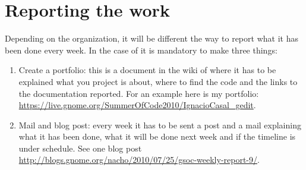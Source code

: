 \section{Reporting the work}\label{ReportingGSoC}

Depending on the organization, it will be different the way to report what it has been done every week. In the case of \GNOME it is mandatory to make three things:

\begin{enumerate}
  \item Create a portfolio: this is a document in the wiki of \GNOME where it has to be explained what you project is about, where to find the code and the links to the documentation reported. For an example here is my portfolio: \url{https://live.gnome.org/SummerOfCode2010/IgnacioCasal_gedit}.
  \item Mail and blog post: every week it has to be sent a post and a mail explaining what it has been done, what it will be done next week and if the timeline is under schedule. See one blog post \url{http://blogs.gnome.org/nacho/2010/07/25/gsoc-weekly-report-9/}.
\end{enumerate}
